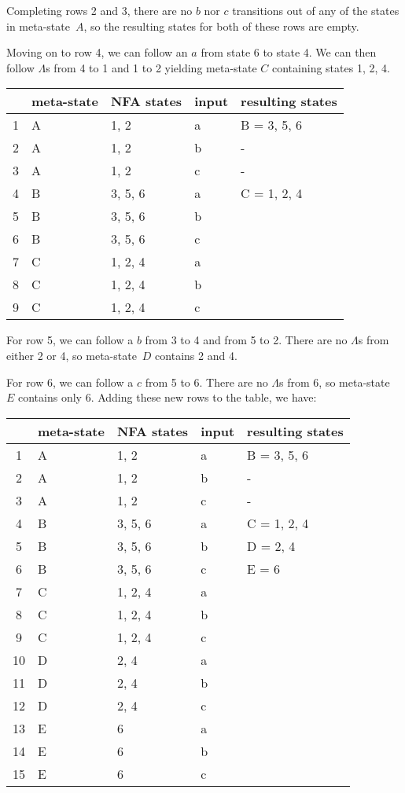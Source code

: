\documentclass[letterpaper,12pt,openany,reqno]{book}%
\begin{document}
Completing rows 2 and 3, there are no $b$ nor $c$ transitions out of any of the states in meta-state~$A$, so the resulting states for both of these rows are empty.

Moving on to row 4, we can follow an $a$ from state 6 to state 4. We can then follow $\Lambda$s from 4 to 1 and 1 to 2 yielding meta-state $C$ containing states 1, 2, 4.

\begin{center}
\small
\begin{tabular}{c|l|l|l|l}
\hline
& \textbf{meta-state} & \textbf{NFA states} & \textbf{input} & \textbf{resulting states} \\
\hline
1 & A & 1, 2 & a & B = 3, 5, 6 \\
2 & A & 1, 2 & b & - \\
3 & A & 1, 2 & c & - \\
4 & B & 3, 5, 6 & a & C = 1, 2, 4 \\
5 & B & 3, 5, 6 & b & \\
6 & B & 3, 5, 6 & c & \\
7 & C & 1, 2, 4 & a & \\
8 & C & 1, 2, 4 & b & \\
9 & C & 1, 2, 4 & c & \\
\hline
\end{tabular}
\end{center}

For row 5, we can follow a $b$ from 3 to 4 and from 5 to 2. There are no $\Lambda$s from either 2 or 4, so meta-state~$D$ contains 2 and 4.

For row 6, we can follow a $c$ from 5 to 6. There are no $\Lambda$s from 6, so meta-state~$E$ contains only 6. Adding these new rows to the table, we have:

\begin{center}
\small
\begin{tabular}{c|l|l|l|l}
\hline
& \textbf{meta-state} & \textbf{NFA states} & \textbf{input} & \textbf{resulting states} \\
\hline
1 & A & 1, 2 & a & B = 3, 5, 6 \\
2 & A & 1, 2 & b & - \\
3 & A & 1, 2 & c & - \\
4 & B & 3, 5, 6 & a & C = 1, 2, 4 \\
5 & B & 3, 5, 6 & b & D = 2, 4 \\
6 & B & 3, 5, 6 & c & E = 6 \\
7 & C & 1, 2, 4 & a & \\
8 & C & 1, 2, 4 & b & \\
9 & C & 1, 2, 4 & c & \\
10 & D & 2, 4 & a & \\
11 & D & 2, 4 & b & \\
12 & D & 2, 4 & c & \\
13 & E & 6 & a & \\
14 & E & 6 & b & \\
15 & E & 6 & c & \\
\hline
\end{tabular}
\end{center}
\end{document}
